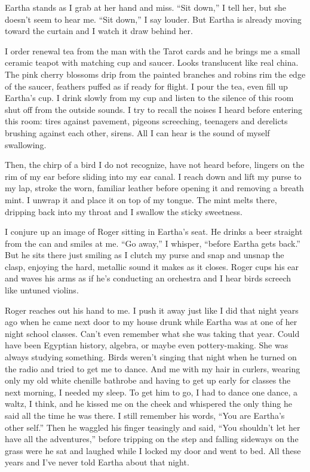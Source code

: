 \documentclass[
]{article}
\begin{document}
Eartha stands as I grab at her hand and miss. ``Sit down,'' I tell her,
but she doesn't seem to hear me. ``Sit down,'' I say louder. But Eartha
is already moving toward the curtain and I watch it draw behind her.

I order renewal tea from the man with the Tarot cards and he brings me a
small ceramic tea­pot with matching cup and saucer. Looks translucent
like real china. The pink cherry blossoms drip from the painted branches
and robins rim the edge of the saucer, feathers puffed as if ready for
flight. I pour the tea, even fill up Eartha's cup. I drink slowly from
my cup and listen to the silence of this room shut off from the outside
sounds. I try to recall the noises I heard before entering this room:
tires against pavement, pigeons screeching, teenagers and derelicts
brushing against each other, sirens. All I can hear is the sound of
myself swallowing.

Then, the chirp of a bird I do not recognize, have not heard before,
lingers on the rim of my ear before sliding into my ear canal. I reach
down and lift my purse to my lap, stroke the worn, famil­iar leather
before opening it and removing a breath mint. I unwrap it and place it
on top of my tongue. The mint melts there, dripping back into my throat
and I swallow the sticky sweetness.

I conjure up an image of Roger sitting in Eartha's seat. He drinks a
beer straight from the can and smiles at me. ``Go away,'' I whisper,
``before Eartha gets back.'' But he sits there just smiling as I clutch
my purse and snap and unsnap the clasp, enjoying the hard, metallic
sound it makes as it closes. Roger cups his ear and waves his arms as if
he's conducting an orchestra and I hear birds screech like untuned
violins.

Roger reaches out his hand to me. I push it away just like I did that
night years ago when he came next door to my house drunk while Eartha
was at one of her night school classes. Can't even remember what she was
taking that year. Could have been Egyptian history, algebra, or maybe
even pottery-making. She was always studying something. Birds weren't
singing that night when he turned on the radio and tried to get me to
dance. And me with my hair in curlers, wearing only my old white
chenille bathrobe and having to get up early for classes the next
morning, I needed my sleep. To get him to go, I had to dance one dance,
a waltz, I think, and he kissed me on the cheek and whispered the only
thing he said all the time he was there. I still remember his words,
``You are Eartha's other self.'' Then he waggled his finger teasingly
and said, ``You shouldn't let her have all the adventures,'' before
tripping on the step and falling sideways on the grass were he sat and
laughed while I locked my door and went to bed. All these years and I've
never told Eartha about that night.
\end{document}
